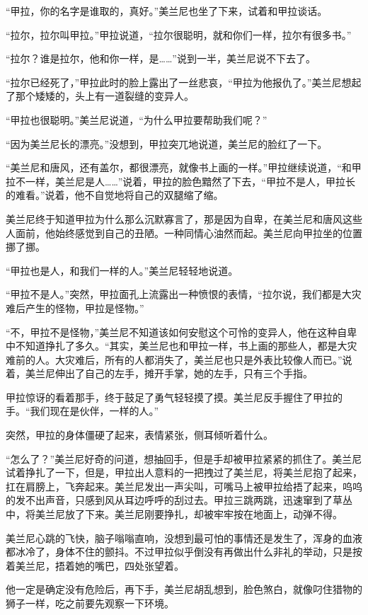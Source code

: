 “甲拉，你的名字是谁取的，真好。”美兰尼也坐了下来，试着和甲拉谈话。

“拉尔，拉尔叫甲拉。”甲拉说道，“拉尔很聪明，就和你们一样，拉尔有很多书。”

“拉尔？谁是拉尔，他和你一样，是……”说到一半，美兰尼说不下去了。

“拉尔已经死了，”甲拉此时的脸上露出了一丝悲哀，“甲拉为他报仇了。”美兰尼想起了那个矮矮的，头上有一道裂缝的变异人。

“甲拉也很聪明。”美兰尼说道，“为什么甲拉要帮助我们呢？”

“因为美兰尼长的漂亮。”没想到，甲拉突兀地说道，美兰尼的脸红了一下。

“美兰尼和唐风，还有盖尔，都很漂亮，就像书上画的一样。”甲拉继续说道，“和甲拉不一样，美兰尼是人……”说着，甲拉的脸色黯然了下去，“甲拉不是人，甲拉长的难看。”说着，他不自觉地将自己的双腿缩了缩。

美兰尼终于知道甲拉为什么那么沉默寡言了，那是因为自卑，在美兰尼和唐风这些人面前，他始终感觉到自己的丑陋。一种同情心油然而起。美兰尼向甲拉坐的位置挪了挪。

“甲拉也是人，和我们一样的人。”美兰尼轻轻地说道。

“甲拉不是人。”突然，甲拉面孔上流露出一种愤恨的表情，“拉尔说，我们都是大灾难后产生的怪物，甲拉是怪物。”

“不，甲拉不是怪物，”美兰尼不知道该如何安慰这个可怜的变异人，他在这种自卑中不知道挣扎了多久。“其实，美兰尼也和甲拉一样，书上画的那些人，都是大灾难前的人。大灾难后，所有的人都消失了，美兰尼也只是外表比较像人而已。”说着，美兰尼伸出了自己的左手，摊开手掌，她的左手，只有三个手指。

甲拉惊讶的看着那手，终于鼓足了勇气轻轻摸了摸。美兰尼反手握住了甲拉的手。“我们现在是伙伴，一样的人。”

突然，甲拉的身体僵硬了起来，表情紧张，侧耳倾听着什么。

“怎么了？”美兰尼好奇的问道，想抽回手，但是手却被甲拉紧紧的抓住了。美兰尼试着挣扎了一下，但是，甲拉出人意料的一把拽过了美兰尼，将美兰尼抱了起来，扛在肩膀上，飞奔起来。美兰尼发出一声尖叫，可嘴马上被甲拉给捂了起来，呜呜的发不出声音，只感到风从耳边呼呼的刮过去。甲拉三跳两跳，迅速窜到了草丛中，将美兰尼放了下来。美兰尼刚要挣扎，却被牢牢按在地面上，动弹不得。

美兰尼心跳的飞快，脑子嗡嗡直响，没想到最可怕的事情还是发生了，浑身的血液都冰冷了，身体不住的颤抖。不过甲拉似乎倒没有再做出什么非礼的举动，只是按着美兰尼，捂着她的嘴巴，四处张望着。

他一定是确定没有危险后，再下手，美兰尼胡乱想到，脸色煞白，就像叼住猎物的狮子一样，吃之前要先观察一下环境。

